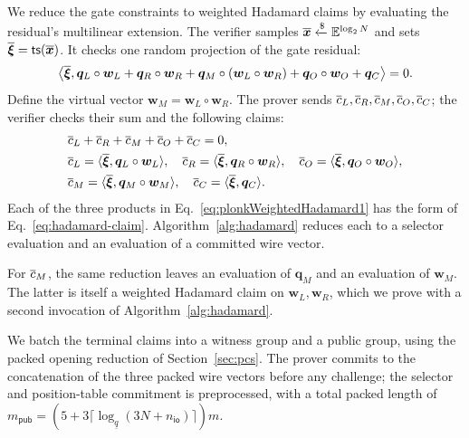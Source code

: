 We reduce the gate constraints to weighted Hadamard claims by
evaluating the residual's multilinear extension. The verifier samples
\(\overline{\bm x}\mathrel{\xleftarrow{\$}}\mathbb{E}^{\log_2N}\) and sets
\(\overline{\bm\xi}={\sf ts}(\overline{\bm x})\).
It checks one random projection of the gate residual:
\[
    \left\langle \overline{\bm\xi},
    \bm q_L\circ\bm w_L+\bm q_R\circ\bm w_R
    +\bm q_M\circ(\bm w_L\circ\bm w_R)
    +\bm q_O\circ\bm w_O+\bm q_C\right\rangle=0.
\]
Define the virtual vector \(\bm w_M=\bm w_L\circ\bm w_R\).
The prover sends
\(\overline{c}_L,\overline{c}_R,\overline{c}_M,\overline{c}_O,\overline{c}_C\);
the verifier checks their sum and the following claims:
\begin{align}
    &\overline{c}_L+\overline{c}_R+\overline{c}_M+\overline{c}_O+\overline{c}_C=0,
    \nonumber\\
    &\overline{c}_L=\langle\overline{\bm\xi},\bm q_L\circ\bm w_L\rangle,
    \quad
    \overline{c}_R=\langle\overline{\bm\xi},\bm q_R\circ\bm w_R\rangle,
    \quad
    \overline{c}_O=\langle\overline{\bm\xi},\bm q_O\circ\bm w_O\rangle,
    \label{eq:plonkWeightedHadamard1}\\
    &\overline{c}_M=\langle\overline{\bm\xi},\bm q_M\circ\bm w_M\rangle,
    \quad
    \overline{c}_C=\langle\overline{\bm\xi},\bm q_C\rangle.
    \label{eq:plonkWeightedHadamard2}
\end{align}
Each of the three products in
Eq.~\eqref{eq:plonkWeightedHadamard1} has the form of
Eq.~\eqref{eq:hadamard-claim}. Algorithm~\ref{alg:hadamard}
reduces each to a selector evaluation and an evaluation of a committed
wire vector.

For \(\overline{c}_M\), the same reduction leaves an evaluation of
\(\bm q_M\) and an evaluation of \(\bm w_M\). The latter is
itself a weighted Hadamard claim on \(\bm w_L,\bm w_R\), which
we prove with a second invocation of Algorithm~\ref{alg:hadamard}.

We batch the terminal claims into a witness group and a public
group, using the packed opening reduction of Section~\ref{sec:pcs}.
The prover commits to the concatenation of the three packed wire
vectors before any challenge; the selector and position-table
commitment is preprocessed, with a total packed length of \(m_{\mathsf{pub}}=
(5+3\lceil\log_{\underline q}(3N+n_{\mathsf{io}})\rceil)m\).

